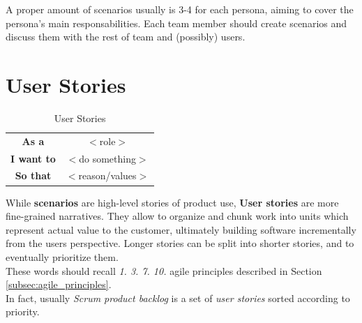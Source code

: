\begin{center}
\end{center}

A proper amount of scenarios usually is 3-4 for each persona, aiming to cover the persona's main responsabilities.
Each team member should create scenarios and discuss them with the rest of team and (possibly) users.

\section{User Stories}
\begin{table}[h]
    \centering
    \begin{tabular}{|cc|}
        \hline
        \textbf{As a} & \hspace{2.5cm} $<$role$>$\\
        \textbf{I want to} & \hspace{2.5cm} $<$do something$>$ \\
        \textbf{So that} & \hspace{2.5cm} $<$reason/values$>$ \\
        \hline
    \end{tabular}
    \caption{User Stories}
    \label{tab:my_label}
\end{table}

While \textbf{scenarios} are high-level stories of product use, \textbf{User stories} are more fine-grained narratives.
They allow to organize and chunk work into units which represent actual value to the customer, ultimately building software incrementally from the users perspective.
Longer stories can be split into shorter stories, and to eventually prioritize them.\\
These words should recall \textit{1. 3. 7. 10.} agile principles described in Section \ref{subsec:agile_principles}.\\
In fact, usually \textit{Scrum product backlog} is a set of \textit{user stories} sorted according to priority.

